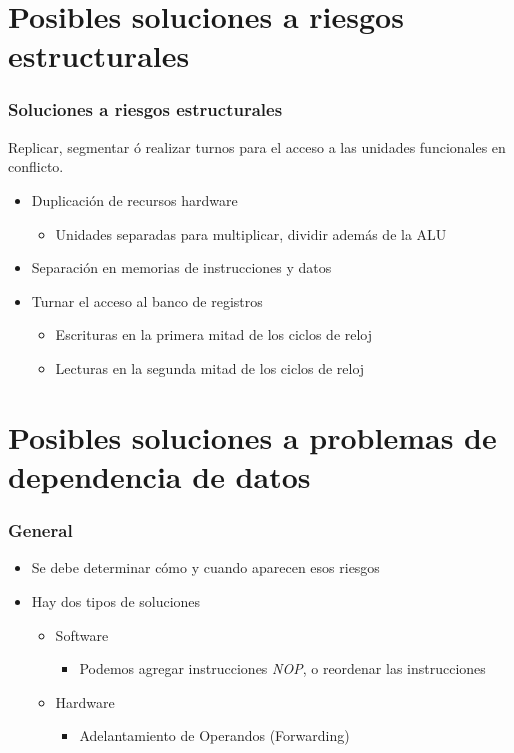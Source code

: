 \documentclass{beamer}
\begin{document}
\section{Posibles soluciones a riesgos estructurales}
\begin{frame}
\frametitle{Soluciones a riesgos estructurales}
Replicar, segmentar ó realizar turnos para el acceso a las unidades funcionales en conflicto.
\begin{itemize}
\item Duplicación de recursos hardware
\begin{itemize}
\item Unidades separadas para multiplicar, dividir además de la ALU
\end{itemize}
\item Separación en memorias de instrucciones y datos
\item Turnar el acceso al banco de registros
\begin{itemize}
\item Escrituras en la primera mitad de los ciclos de reloj
\item Lecturas en la segunda mitad de los ciclos de reloj
\end{itemize}
\end{itemize}
\end{frame}


\section{Posibles soluciones a problemas de dependencia de datos}
\begin{frame}
\frametitle{General}
\begin{itemize}
\item Se debe determinar cómo y cuando aparecen esos riesgos
\item Hay dos tipos de soluciones
\begin{itemize}
\item Software
\begin{itemize}
\item Podemos agregar instrucciones \emph{NOP}, o reordenar las instrucciones
\end{itemize}
\item Hardware
\begin{itemize}
\item Adelantamiento de Operandos (Forwarding)
\end{itemize}
\end{itemize}
\end{itemize}
\end{frame}
\end{document}
